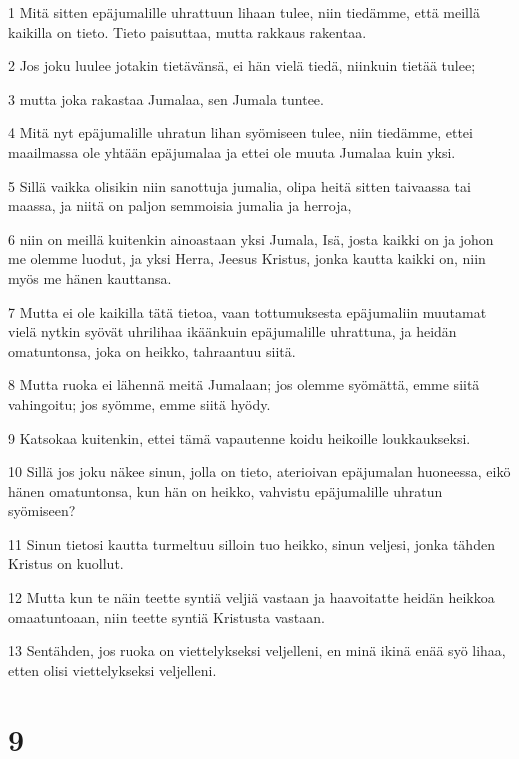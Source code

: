 \par 1 Mitä sitten epäjumalille uhrattuun lihaan tulee, niin tiedämme, että meillä kaikilla on tieto. Tieto paisuttaa, mutta rakkaus rakentaa.
\par 2 Jos joku luulee jotakin tietävänsä, ei hän vielä tiedä, niinkuin tietää tulee;
\par 3 mutta joka rakastaa Jumalaa, sen Jumala tuntee.
\par 4 Mitä nyt epäjumalille uhratun lihan syömiseen tulee, niin tiedämme, ettei maailmassa ole yhtään epäjumalaa ja ettei ole muuta Jumalaa kuin yksi.
\par 5 Sillä vaikka olisikin niin sanottuja jumalia, olipa heitä sitten taivaassa tai maassa, ja niitä on paljon semmoisia jumalia ja herroja,
\par 6 niin on meillä kuitenkin ainoastaan yksi Jumala, Isä, josta kaikki on ja johon me olemme luodut, ja yksi Herra, Jeesus Kristus, jonka kautta kaikki on, niin myös me hänen kauttansa.
\par 7 Mutta ei ole kaikilla tätä tietoa, vaan tottumuksesta epäjumaliin muutamat vielä nytkin syövät uhrilihaa ikäänkuin epäjumalille uhrattuna, ja heidän omatuntonsa, joka on heikko, tahraantuu siitä.
\par 8 Mutta ruoka ei lähennä meitä Jumalaan; jos olemme syömättä, emme siitä vahingoitu; jos syömme, emme siitä hyödy.
\par 9 Katsokaa kuitenkin, ettei tämä vapautenne koidu heikoille loukkaukseksi.
\par 10 Sillä jos joku näkee sinun, jolla on tieto, aterioivan epäjumalan huoneessa, eikö hänen omatuntonsa, kun hän on heikko, vahvistu epäjumalille uhratun syömiseen?
\par 11 Sinun tietosi kautta turmeltuu silloin tuo heikko, sinun veljesi, jonka tähden Kristus on kuollut.
\par 12 Mutta kun te näin teette syntiä veljiä vastaan ja haavoitatte heidän heikkoa omaatuntoaan, niin teette syntiä Kristusta vastaan.
\par 13 Sentähden, jos ruoka on viettelykseksi veljelleni, en minä ikinä enää syö lihaa, etten olisi viettelykseksi veljelleni.

\chapter{9}

